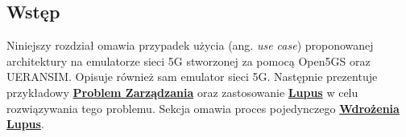 \subsection{Wstęp}

Niniejszy rozdział omawia przypadek użycia (ang. \textit{use case}) proponowanej architektury na emulatorze sieci 5G stworzonej za pomocą Open5GS oraz UERANSIM. Opisuje również sam emulator sieci 5G. Następnie prezentuje przykładowy \hyperlink{def:problem-zarzadzania}{\textbf{Problem Zarządzania}} oraz zastosowanie \hyperlink{def:lupus}{\textbf{Lupus}} w celu rozwiązywania tego problemu. Sekcja omawia proces pojedynczego \hyperlink{def:wdrozenie-lupus}{\textbf{Wdrożenia Lupus}}.
